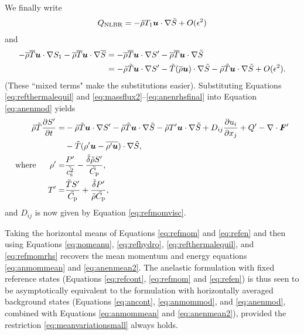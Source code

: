 \documentclass[12pt]{article}
\newcommand{\vecf}{\bm{F}}
\begin{document}
We finally write 
\begin{align}
	Q_{\rm NLBR} = -\tilde{\rho} T_1\bm{u}\cdot\nabla\tilde{S} + O(\epsilon^2)
\end{align}
and 
\begin{align}\label{eq:anenrhsfinal}
	-\overline{\rho}\overline{T} \bm{u}\cdot\nabla S_1 - \overline{\rho}\overline{T} \bm{u}\cdot\nabla\overline{S} &= - \overline{\rho}\overline{T}\bm{u}\cdot\nabla {S^\prime} -\overline{\rho}\overline{T}\bm{u}\cdot\nabla\tilde{S} \nonumber\\
	&=-\tilde{\rho}\tilde{T}\bm{u}\cdot\nabla {S^\prime} - \tilde{T}(\overline{\rho} \bm{u})\cdot\nabla\tilde{S} - \tilde{\rho}\hat{T}\bm{u}\cdot\nabla\tilde{S} + O(\epsilon^2).
\end{align}
(These ``mixed terms" make the substitutions easier). Substituting Equations \eqref{eq:refthermalequil} and \eqref{eq:massflux2}--\eqref{eq:anenrhsfinal} into Equation \eqref{eq:anenmod} yields
\begin{subequations}\label{eq:refen}
	\begin{align}
		\rhotilde\tmptilde\pderiv{\entrprime}{t}= &-\rhotilde\tmptilde\ugrad \entrprime - \rhotilde\tmptilde \ugrad \entrtilde - \rhotilde \tmpprime\ugrad\entrtilde+D_{ij}\pderiv{u_i}{x_j} + Q^\prime- \Div\vecf^\prime  \nonumber\\
		& - \tmptilde(\rhoprime \vecu-\overline{\rhoprime\vecu})\cdot\nabla\entrtilde,\label{eq:refenmain}\\
		\where \rhoprime =& \frac{\prsprime}{\tilde{\cs^2}}-\frac{\deltatilde \rhotilde S ^\prime}{\cptilde},\label{eq:refenrhopert}\\
		 \tmpprime = & \frac{\tmptilde \entrprime}{\cptilde} + \frac{\deltatilde  \prsprime}{\rhotilde\cptilde},\label{eq:refentmppert}
	\end{align}
\end{subequations}
and $D_{ij}$ is now given by Equation \eqref{eq:refmomvisc}. 

Taking the horizontal means of Equations \eqref{eq:refmom} and \eqref{eq:refen} and then using Equations \eqref{eq:nomeanu}, \eqref{eq:refhydro}, \eqref{eq:refthermalequil}, and \eqref{eq:refmomrhs} recovers the mean momentum and energy equations \eqref{eq:anmommean} and \eqref{eq:anenmean2}. The anelastic formulation with fixed reference states (Equations \eqref{eq:refcont}, \eqref{eq:refmom} and \eqref{eq:refen}) is thus seen to be asymptotically equivalent to the formulation with horizontally averaged background states (Equations \eqref{eq:ancont}, \eqref{eq:anmommod}, and \eqref{eq:anenmod}, combined with Equations \eqref{eq:anmommean} and \eqref{eq:anenmean2}), provided the restriction \eqref{eq:meanvariationsmall} always holds. %
\end{document}
